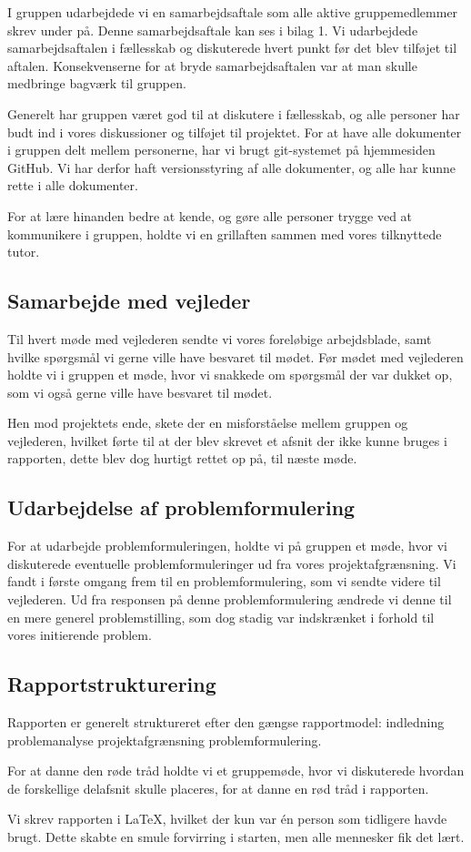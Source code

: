 I gruppen udarbejdede vi en samarbejdsaftale som alle aktive gruppemedlemmer skrev under på. Denne samarbejdsaftale kan ses i bilag 1. Vi udarbejdede samarbejdsaftalen i fællesskab og diskuterede hvert punkt før det blev tilføjet til aftalen. Konsekvenserne for at bryde samarbejdsaftalen var at man skulle medbringe bagværk til gruppen. 

Generelt har gruppen været god til at diskutere i fællesskab, og alle personer har budt ind i vores diskussioner og tilføjet til projektet. For at have alle dokumenter i gruppen delt mellem personerne, har vi brugt git-systemet på hjemmesiden GitHub. Vi har derfor haft versionsstyring af alle dokumenter, og alle har kunne rette i alle dokumenter. 

For at lære hinanden bedre at kende, og gøre alle personer trygge ved at kommunikere i gruppen, holdte vi en grillaften sammen med vores tilknyttede tutor. 

\subsection*{Samarbejde med vejleder}
Til hvert møde med vejlederen sendte vi vores foreløbige arbejdsblade, samt hvilke spørgsmål vi gerne ville have besvaret til mødet. Før mødet med vejlederen holdte vi i gruppen et møde, hvor vi snakkede om spørgsmål der var dukket op, som vi også gerne ville have besvaret til mødet. 

Hen mod projektets ende, skete der en misforståelse mellem gruppen og vejlederen, hvilket førte til at der blev skrevet et afsnit der ikke kunne bruges i rapporten, dette blev dog hurtigt rettet op på, til næste møde.

\subsection*{Udarbejdelse af problemformulering}
For at udarbejde problemformuleringen, holdte vi på gruppen et møde, hvor vi diskuterede eventuelle problemformuleringer ud fra vores projektafgrænsning. Vi fandt i første omgang frem til en problemformulering, som vi sendte videre til vejlederen. Ud fra responsen på denne problemformulering ændrede vi denne til en mere generel problemstilling, som dog stadig var indskrænket i forhold til vores initierende problem.

\subsection*{Rapportstrukturering}
Rapporten er generelt struktureret efter den gængse rapportmodel: indledning \textrightarrow problemanalyse \textrightarrow projektafgrænsning \textrightarrow problemformulering. 

For at danne den røde tråd holdte vi et gruppemøde, hvor vi diskuterede hvordan de forskellige delafsnit skulle placeres, for at danne en rød tråd i rapporten.

Vi skrev rapporten i \LaTeX, hvilket der kun var \'en person som tidligere havde brugt. Dette skabte en smule forvirring i starten, men alle mennesker fik det lært.
